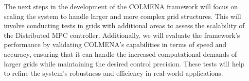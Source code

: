 \documentclass{article}
\begin{document}
The next steps in the development of the COLMENA framework will focus on scaling the system to handle larger and more complex grid structures. This will involve conducting tests in grids with additional areas to assess the scalability of the Distributed MPC controller. Additionally, we will evaluate the framework’s performance by validating COLMENA's capabilities in terms of speed and accuracy, ensuring that it can handle the increased computational demands of larger grids while maintaining the desired control precision. These tests will help to refine the system's robustness and efficiency in real-world applications.

\newpage
\nocite{*}  
\printbibliography
\end{document}
